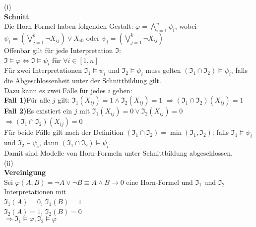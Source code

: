 \documentclass[11pt, a4paper]{article}
\begin{document}
\begin{adjustwidth}{20pt}{20pt}
(i)\\
\textbf{Schnitt}\\
Die Horn-Formel haben folgenden Gestalt: $\varphi = \bigwedge \limits_{i=1}^n \psi_i$, wobei $\psi_i= (\bigvee \limits_{j=1}^k\neg X_{ij}) \vee X_{i0}$ oder $\psi_i= (\bigvee \limits_{j=1}^k\neg X_{ij})$\\

Offenbar gilt für jede Interpretation $\mathfrak{I}$:\\

$\mathfrak{I} \models \varphi \Leftrightarrow \mathfrak{I} \models \psi_i$ für $\forall i \in [1,n]$\\

Für zwei Interpretationen $\mathfrak{I_1} \models \psi_i$ und $\mathfrak{I_2} \models \psi_i$ muss  gelten $(\mathfrak{I_1} \cap \mathfrak{I_2}) \models \psi_i$, falls die Abgeschlossenheit unter der Schnittbildung gilt.\\

Dazu kann es zwei Fälle für jedes $i$ geben:\\
\textbf{Fall 1)}Für alle $j$ gilt: $\mathfrak{I_1}(X_{ij})=1 \wedge \mathfrak{I_2}(X_{ij})=1$  \hspace*{45 pt} $\Rightarrow (\mathfrak{I_1} \cap \mathfrak{I_2})(X_{ij})=1$\\
\textbf{Fall 2)}Es existiert ein $j$ mit $\mathfrak{I_1}(X_{ij})=0 \vee \mathfrak{I_2}(X_{ij})=0$ \hspace*{15 pt} $\Rightarrow (\mathfrak{I_1} \cap \mathfrak{I_2})(X_{ij})=0$\\

Für beide Fälle gilt nach der Definition $(\mathfrak{I_1} \cap \mathfrak{I_2}) = \min(\mathfrak{I_1}, \mathfrak{I_2})$: falls $\mathfrak{I_1} \models \psi_i$ und $\mathfrak{I_2} \models \psi_i$, dann $(\mathfrak{I_1} \cap \mathfrak{I_2}) \models \psi_i$.\\

Damit sind Modelle von Horn-Formeln unter Schnittbildung abgeschlossen.\\
(ii)\\
\textbf{Vereinigung}\\
Sei $\varphi(A,B) = \neg A \vee \neg B  \equiv A \wedge B \rightarrow 0$ eine Horn-Formel und $\mathfrak{I_1}$ und $\mathfrak{I_2}$ Interpretationen mit\\
$\mathfrak{I_1}(A)=0$, $\mathfrak{I_1}(B)=1$\\
$\mathfrak{I_2}(A)=1$, $\mathfrak{I_2}(B)=0$\\
$\Rightarrow \mathfrak{I_1} \models \varphi, \mathfrak{I_2} \models \varphi$\\


\end{adjustwidth}
\end{document}
